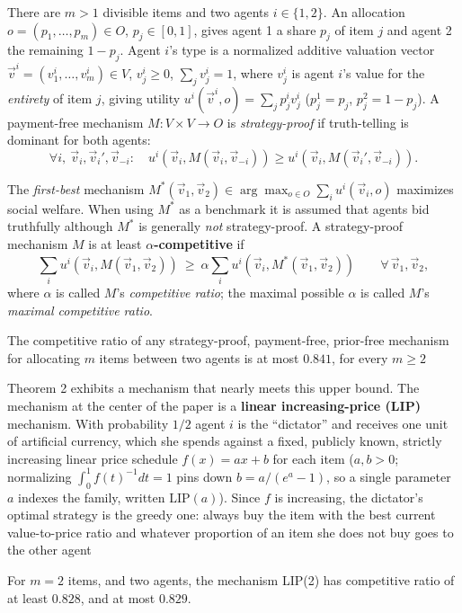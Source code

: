 There are $m>1$ divisible items and two agents $i \in \{1,2\}$. An allocation $o=(p_1,\dots,p_m)\in O$, $p_j\in[0,1]$, gives agent 1 a share $p_j$ of item $j$ and agent 2 the remaining $1-p_j$. Agent $i$'s type is a normalized additive valuation vector $\vec v^i=(v^i_1,\dots,v^i_m) \in V$, $v^i_j\ge 0$, $\sum_j v^i_j=1$, where $v^i_j$ is agent $i$'s value for the \textit{entirety} of item $j$, giving utility $u^i(\vec v^i,o)=\sum_j p^i_j v^i_j$ ($p^1_j=p_j$, $p^2_j=1-p_j$). A payment-free mechanism $M:V\times V\to O$ is \emph{strategy-proof} if truth-telling is dominant for both agents:
$$\forall i,\ \vec v_i,\vec v_i',\vec v_{-i}:\quad u^i(\vec v_i, M(\vec v_i,\vec v_{-i})) \ge u^i(\vec v_i, M(\vec v_i',\vec v_{-i})).$$

The \emph{first-best} mechanism $M^*(\vec v_1,\vec v_2)\in \arg\max_{o\in O}\sum_i u^i(\vec v_i,o)$ maximizes social welfare. When using $M^*$ as a benchmark it is assumed that agents bid truthfully although $M^*$ is generally \emph{not} strategy-proof. A strategy-proof mechanism $M$ is at least \textbf{$\alpha$-competitive} if
$$\sum_i u^i(\vec v_i, M(\vec v_1,\vec v_2)) \ \ge\ \alpha\sum_i u^i(\vec v_i, M^*(\vec v_1,\vec v_2)) \qquad \forall\, \vec v_1,\vec v_2,$$
where  $\alpha$ is called $M$'s \textit{competitive ratio}; the maximal possible $\alpha$ is called $M$'s \textit{maximal competitive ratio}.

\begin{theorem}
 The competitive ratio of any strategy-proof, payment-free, prior-free mechanism for allocating $m$ items between two agents is at most $0.841$, for every $m\ge 2$
\end{theorem}

Theorem 2 exhibits a mechanism that nearly meets this upper bound. The mechanism at the center of the paper is a \textbf{linear increasing-price (LIP)} mechanism. With probability $1/2$ agent $i$ is the ``dictator'' and receives one unit of artificial currency, which she spends against a fixed, publicly known, strictly increasing linear price schedule $f(x)=ax+b$ for each item ($a,b>0$; normalizing $\int_0^1 f(t)^{-1}dt=1$ pins down $b=a/(e^a-1)$, so a single parameter $a$ indexes the family, written $\mathrm{LIP}(a)$). Since $f$ is increasing, the dictator's optimal strategy is the greedy one: always buy the item with the best current value-to-price ratio and whatever proportion of an item she does not buy goes to the other agent

\begin{theorem}
 For $m=2$ items, and two agents, the mechanism LIP(2) has competitive ratio of at least $0.828$, and at most $0.829$.
\end{theorem}

